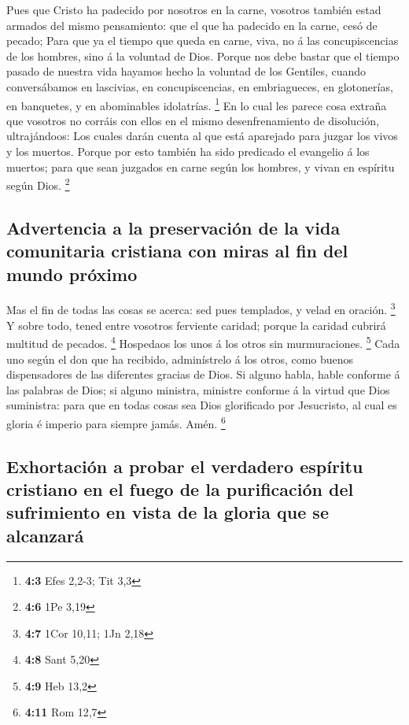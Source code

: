  Pues que Cristo ha padecido por nosotros en la carne,
vosotros también estad armados del mismo pensamiento: que el que ha
padecido en la carne, cesó de pecado;  Para que ya el tiempo
que queda en carne, viva, no á las concupiscencias de los hombres, sino
á la voluntad de Dios.  Porque nos debe bastar que el tiempo
pasado de nuestra vida hayamos hecho la voluntad de los Gentiles, cuando
conversábamos en lascivias, en concupiscencias, en embriagueces, en
glotonerías, en banquetes, y en abominables idolatrías. \footnote{\textbf{4:3}
  Efes 2,2-3; Tit 3,3}  En lo cual les parece cosa extraña
que vosotros no corráis con ellos en el mismo desenfrenamiento de
disolución, ultrajándoos:  Los cuales darán cuenta al que
está aparejado para juzgar los vivos y los muertos.  Porque
por esto también ha sido predicado el evangelio á los muertos; para que
sean juzgados en carne según los hombres, y vivan en espíritu según
Dios. \footnote{\textbf{4:6} 1Pe 3,19}

\hypertarget{advertencia-a-la-preservaciuxf3n-de-la-vida-comunitaria-cristiana-con-miras-al-fin-del-mundo-pruxf3ximo}{%
\subsection{Advertencia a la preservación de la vida comunitaria
cristiana con miras al fin del mundo
próximo}\label{advertencia-a-la-preservaciuxf3n-de-la-vida-comunitaria-cristiana-con-miras-al-fin-del-mundo-pruxf3ximo}}

 Mas el fin de todas las cosas se acerca: sed pues
templados, y velad en oración. \footnote{\textbf{4:7} 1Cor 10,11; 1Jn
  2,18}  Y sobre todo, tened entre vosotros ferviente
caridad; porque la caridad cubrirá multitud de pecados. \footnote{\textbf{4:8}
  Sant 5,20}  Hospedaos los unos á los otros sin
murmuraciones. \footnote{\textbf{4:9} Heb 13,2}  Cada uno
según el don que ha recibido, adminístrelo á los otros, como buenos
dispensadores de las diferentes gracias de Dios.  Si alguno
habla, hable conforme á las palabras de Dios; si alguno ministra,
ministre conforme á la virtud que Dios suministra: para que en todas
cosas sea Dios glorificado por Jesucristo, al cual es gloria é imperio
para siempre jamás. Amén. \footnote{\textbf{4:11} Rom 12,7}

\hypertarget{exhortaciuxf3n-a-probar-el-verdadero-espuxedritu-cristiano-en-el-fuego-de-la-purificaciuxf3n-del-sufrimiento-en-vista-de-la-gloria-que-se-alcanzaruxe1}{%
\subsection{Exhortación a probar el verdadero espíritu cristiano en el
fuego de la purificación del sufrimiento en vista de la gloria que se
alcanzará}\label{exhortaciuxf3n-a-probar-el-verdadero-espuxedritu-cristiano-en-el-fuego-de-la-purificaciuxf3n-del-sufrimiento-en-vista-de-la-gloria-que-se-alcanzaruxe1}}

